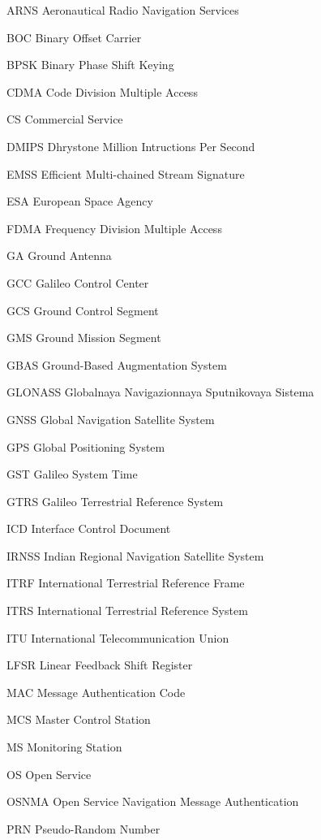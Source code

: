 \begin{abbreviations}

\item[ARNS] Aeronautical Radio Navigation Services
\item[BOC] Binary Offset Carrier
\item[BPSK] Binary Phase Shift Keying
\item[CDMA] Code Division Multiple Access
\item[CS] Commercial Service
\item[DMIPS] Dhrystone Million Intructions Per Second
\item[EMSS] Efficient Multi-chained Stream Signature
\item[ESA] European Space Agency
\item[FDMA] Frequency Division Multiple Access
\item[GA] Ground Antenna
\item[GCC] Galileo Control Center
\item[GCS] Ground Control Segment
\item[GMS] Ground Mission Segment 
\item[GBAS] Ground-Based Augmentation System
\item[GLONASS] Globalnaya Navigazionnaya Sputnikovaya Sistema
\item[GNSS] Global Navigation Satellite System
\item[GPS] Global Positioning System
\item[GST] Galileo System Time
\item[GTRS] Galileo Terrestrial Reference System
\item[ICD] Interface Control Document
\item[IRNSS] Indian Regional Navigation Satellite System
\item[ITRF] International Terrestrial Reference Frame
\item[ITRS] International Terrestrial Reference System
\item[ITU] International Telecommunication Union
\item[LFSR] Linear Feedback Shift Register
\item[MAC] Message Authentication Code
\item[MCS] Master Control Station
\item[MS] Monitoring Station
\item[OS] Open Service
\item[OSNMA] Open Service Navigation Message Authentication
\item[PRN] Pseudo-Random Number

\end{abbreviations}
